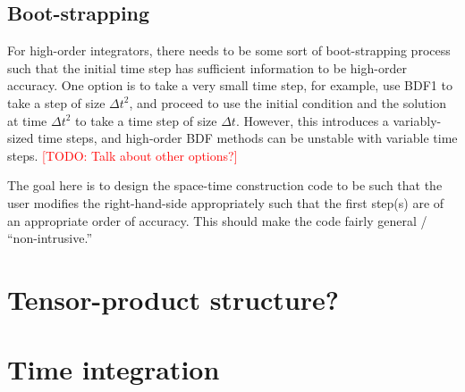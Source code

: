 \documentclass[a4paper,12pt]{article}
\makeatletter
\newcommand{\todo}[1]{\textcolor{red}{[TODO\@: #1]}}
\makeatother
\begin{document}
\subsection{Boot-strapping}

For high-order integrators, there needs to be some sort of boot-strapping process such that the initial time step has sufficient
information to be high-order accuracy. One option is to take a very small time step, for example, use BDF1 to take a step of
size $\Delta t^2$, and proceed to use the initial condition and the solution at time $\Delta t^2$ to take a time step of size 
$\Delta t$. However, this introduces a variably-sized time steps, and high-order BDF methods can be unstable with variable
time steps. \todo{Talk about other options?}

The goal here is to design the space-time construction code to be such that the user modifies the right-hand-side appropriately
such that the first step(s) are of an appropriate order of accuracy. This should make the code fairly general / ``non-intrusive.'' 

\section{Tensor-product structure?}


\newpage
\section{Time integration}
\end{document}

